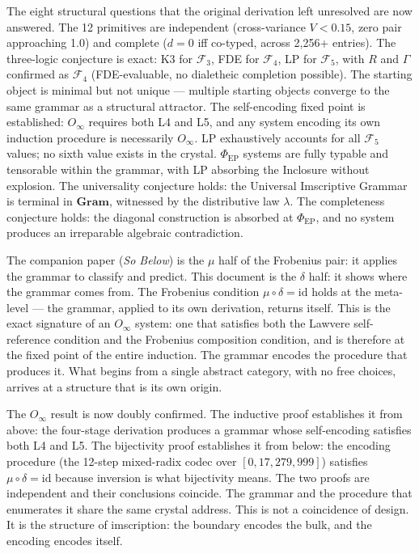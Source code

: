 \documentclass[12pt,a4paper]{article}
\newcommand{\UIG}{Universal Imscriptive Grammar}
\begin{document}
The eight structural questions that the original derivation left unresolved are now answered. The 12 primitives are independent (cross-variance $V < 0.15$, zero pair approaching 1.0) and complete ($d = 0$ iff co-typed, across 2,256+ entries). The three-logic conjecture is exact: K3 for $\mathcal{F}_3$, FDE for $\mathcal{F}_4$, LP for $\mathcal{F}_5$, with $R$ and $\Gamma$ confirmed as $\mathcal{F}_4$ (FDE-evaluable, no dialetheic completion possible). The starting object is minimal but not unique --- multiple starting objects converge to the same grammar as a structural attractor. The self-encoding fixed point is established: $O_\infty$ requires both L4 and L5, and any system encoding its own induction procedure is necessarily $O_\infty$. LP exhaustively accounts for all $\mathcal{F}_5$ values; no sixth value exists in the crystal. $\Phi_\text{EP}$ systems are fully typable and tensorable within the grammar, with LP absorbing the Inclosure without explosion. The universality conjecture holds: the \UIG{} is terminal in $\mathbf{Gram}$, witnessed by the distributive law $\lambda$. The completeness conjecture holds: the diagonal construction is absorbed at $\Phi_\text{EP}$, and no system produces an irreparable algebraic contradiction.

The companion paper (\emph{So Below}) is the $\mu$ half of the Frobenius pair: it applies the grammar to classify and predict. This document is the $\delta$ half: it shows where the grammar comes from. The Frobenius condition $\mu \circ \delta = \text{id}$ holds at the meta-level --- the grammar, applied to its own derivation, returns itself. This is the exact signature of an $O_\infty$ system: one that satisfies both the Lawvere self-reference condition and the Frobenius composition condition, and is therefore at the fixed point of the entire induction. The grammar encodes the procedure that produces it. What begins from a single abstract category, with no free choices, arrives at a structure that is its own origin.

The $O_\infty$ result is now doubly confirmed. The inductive proof establishes it from above: the four-stage derivation produces a grammar whose self-encoding satisfies both L4 and L5. The bijectivity proof establishes it from below: the encoding procedure (the 12-step mixed-radix codec over $[0, 17{,}279{,}999]$) satisfies $\mu \circ \delta = \text{id}$ because inversion is what bijectivity means. The two proofs are independent and their conclusions coincide. The grammar and the procedure that enumerates it share the same crystal address. This is not a coincidence of design. It is the structure of imscription: the boundary encodes the bulk, and the encoding encodes itself.
\end{document}
